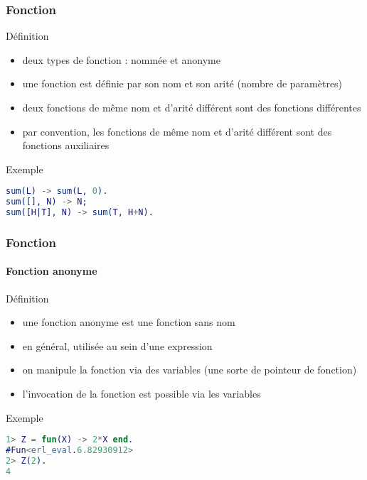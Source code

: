 \begin{frame}[fragile]
  \frametitle{Fonction}

  \begin{block}{Définition}
    \begin{itemize}
    \item deux types de fonction : nommée et anonyme
    \item une fonction est définie par son nom et son arité (nombre de
      paramètres)
    \item deux fonctions de même nom et d'arité différent sont des fonctions
      différentes
    \item par convention, les fonctions de même nom et d'arité différent sont
      des fonctions auxiliaires
    \end{itemize}
  \end{block}

  \begin{exampleblock}{Exemple}
    \begin{lstlisting}[language=erlang]
sum(L) -> sum(L, 0).
sum([], N) -> N;
sum([H|T], N) -> sum(T, H+N).
    \end{lstlisting}
  \end{exampleblock}

\end{frame}

\begin{frame}[fragile]
  \frametitle{Fonction}
  \framesubtitle{Fonction anonyme}

  \begin{block}{Définition}
    \begin{itemize}
    \item une fonction anonyme est une fonction sans nom
    \item en général, utilisée au sein d'une expression
    \item on manipule la fonction via des variables (une sorte de pointeur
      de fonction)
    \item l'invocation de la fonction est possible via les variables
    \end{itemize}
  \end{block}

  \begin{exampleblock}{Exemple}
    \begin{lstlisting}[language=erlang]
1> Z = fun(X) -> 2*X end.
#Fun<erl_eval.6.82930912>
2> Z(2).
4
   \end{lstlisting}
  \end{exampleblock}

\end{frame}

